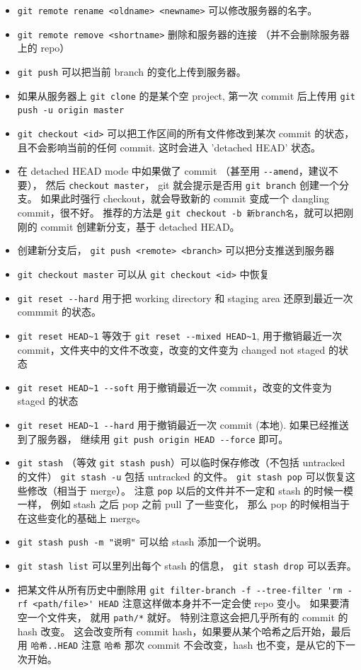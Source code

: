 \begin{itemize}
\item \verb`git remote rename <oldname> <newname>` 可以修改服务器的名字。
\item \verb`git remote remove <shortname>` 删除和服务器的连接 （并不会删除服务器上的 repo）
\item \verb`git push` 可以把当前 branch 的变化上传到服务器。
\item 如果从服务器上 \verb`git clone` 的是某个空 project, 第一次 commit 后上传用 \verb`git push -u origin master`
\item \verb`git checkout <id>` 可以把工作区间的所有文件修改到某次 commit 的状态， 且不会影响当前的任何 commit. 这时会进入 'detached HEAD' 状态。
\item 在 detached HEAD mode 中如果做了 commit （甚至用 \verb`--amend`，建议不要）， 然后 \verb`checkout master`， git 就会提示是否用 \verb`git branch` 创建一个分支。 如果此时强行 checkout，就会导致新的 commit 变成一个 dangling commit，很不好。 推荐的方法是 \verb`git checkout -b 新branch名`，就可以把刚刚的 commit 创建新分支，基于 detached HEAD。
\item 创建新分支后， \verb`git push <remote> <branch>` 可以把分支推送到服务器
\item \verb`git checkout master` 可以从 \verb`git checkout <id>` 中恢复
\item \verb`git reset --hard` 用于把 working directory 和 staging area 还原到最近一次 commmit 的状态。
\item \verb`git reset HEAD~1` 等效于 \verb`git reset --mixed HEAD~1`, 用于撤销最近一次 commit，文件夹中的文件不改变，改变的文件变为 changed not staged 的状态
\item \verb`git reset HEAD~1 --soft` 用于撤销最近一次 commit，改变的文件变为 staged 的状态
\item \verb`git reset HEAD~1 --hard` 用于撤销最近一次 commit (本地). 如果已经推送到了服务器， 继续用 \verb`git push origin HEAD --force` 即可。
\item \verb`git stash` （等效 \verb`git stash push`）可以临时保存修改（不包括 untracked 的文件） \verb`git stash -u` 包括 untracked 的文件。 \verb`git stash pop` 可以恢复这些修改（相当于 merge）。 注意 \verb`pop` 以后的文件并不一定和 stash 的时候一模一样， 例如 stash 之后 pop 之前 pull 了一些变化， 那么 pop 的时候相当于在这些变化的基础上 merge。
\item \verb`git stash push -m "说明"` 可以给 stash 添加一个说明。
\item \verb`git stash list` 可以里列出每个 stash 的信息， \verb`git stash drop` 可以丢弃。
\item 把某文件从所有历史中删除用 \verb`git filter-branch -f --tree-filter 'rm -rf <path/file>' HEAD` 注意这样做本身并不一定会使 repo 变小。 如果要清空一个文件夹， 就用 \verb`path/*` 就好。 特别注意这会把几乎所有的 commit 的 hash 改变。 这会改变所有 commit hash，如果要从某个哈希之后开始，最后用 \verb`哈希..HEAD` 注意 \verb`哈希` 那次 commit 不会改变，hash 也不变，是从它的下一次开始。

\end{itemize}

